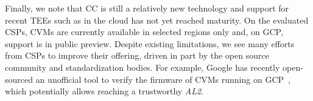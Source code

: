 Finally, we note that CC is still a relatively new technology and support for
recent \acp{TEE} such as \sevsnp{} in the cloud has not yet reached maturity. On
the evaluated \acp{CSP}, \acp{CVM} are currently available in selected regions
only and, on \ac{GCP}, support is in public preview. Despite existing
limitations, we see many efforts from \acp{CSP} to improve their offering,
driven in part by the open source community and standardization bodies. For
example, Google has recently open-sourced an unofficial tool to verify the
firmware of \acp{CVM} running on \ac{GCP}~\cite{gceTcbVerifier}, which
potentially allows reaching a trustworthy \emph{AL2}.
